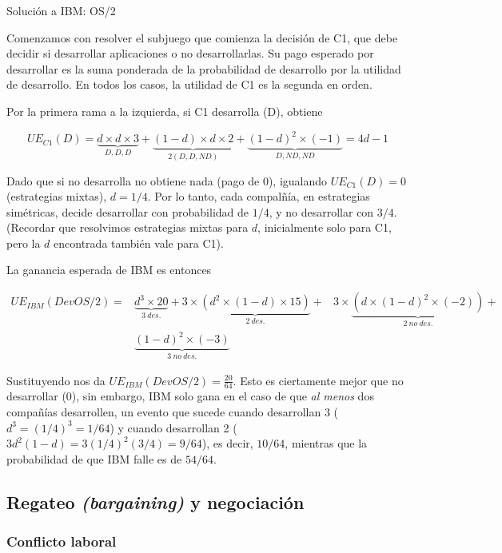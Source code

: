 \documentclass[12pt]{scrartcl}
\begin{document}
\begin{exbox}{Solución a IBM: OS/2}
	
	Comenzamos con resolver el subjuego que comienza la decisión de C1, que debe decidir si desarrollar aplicaciones o no desarrollarlas. Su pago esperado por desarrollar es la suma ponderada de la probabilidad de desarrollo por la utilidad de desarrollo. En todos los casos, la utilidad de C1 es la segunda en orden. 
	
	Por la primera rama a la izquierda, si C1 desarrolla (D), obtiene 
	
	\[UE_{C1}(D) = \underbrace{d\times d \times 3}_{D,D,D} + \underbrace{(1-d)\times d \times 2}_{2(D,D,ND)} + \underbrace{(1-d)^2\times (- 1)}_{D, ND, ND} = 4d-1\]
	
	Dado que si no desarrolla no obtiene nada (pago de 0), igualando $UE_{C1}(D) = 0$ (estrategias mixtas), $d=1/4$. Por lo tanto, cada compalñía, en estrategias simétricas, decide desarrollar con probabilidad de $1/4$, y no desarrollar con $3/4$. (Recordar que resolvimos estrategias mixtas para $d$, inicialmente solo para C1, pero la $d$ encontrada también vale para C1).
	
	La ganancia esperada de IBM es entonces
	
	
	\begin{align*}
		UE_{IBM}(DevOS/2) = & \underbrace{d^3 \times 20}_{3~des.} + 3\times\underbrace{(d^2\times (1-d) \times 15 )}_{2~des.} + & 3\times \underbrace{(d \times (1-d)^2\times (-2))}_{2~no~des.} + \\
		& \underbrace{(1-d)^2 \times (-3)}_{3~no~des.}
	\end{align*}
	
	Sustituyendo nos da $UE_{IBM}(DevOS/2) = \frac{20}{64}$. Esto es ciertamente mejor que no desarrollar (0), sin embargo, IBM solo gana en el caso de que \textit{al menos} dos compañías desarrollen, un evento que sucede cuando desarrollan 3 ($d^3=(1/4)^3=1/64$) y cuando desarrollan 2 ($3d^2(1-d)=3(1/4)^2(3/4)=9/64$), es decir, $10/64$, mientras que la probabilidad de que IBM falle es de $54/64$.
	
\end{exbox}

\subsection{Regateo \textit{(bargaining)} y negociación}

\subsubsection{Conflicto laboral}
\end{document}
